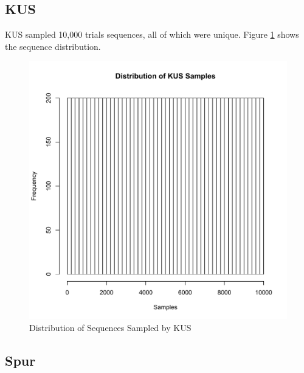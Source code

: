 \subsection{KUS}


KUS sampled 10,000 trials sequences, all of which were unique. Figure \ref{fig:kus_samples} shows the sequence distribution.

\begin{figure}[t]
\centering
\centerline{\includegraphics[origin=c,width=12cm]{../figures/kus-samples.pdf}}
\caption{Distribution of Sequences Sampled by KUS}
\label{fig:kus_samples}
\end{figure}


\subsection{Spur}

